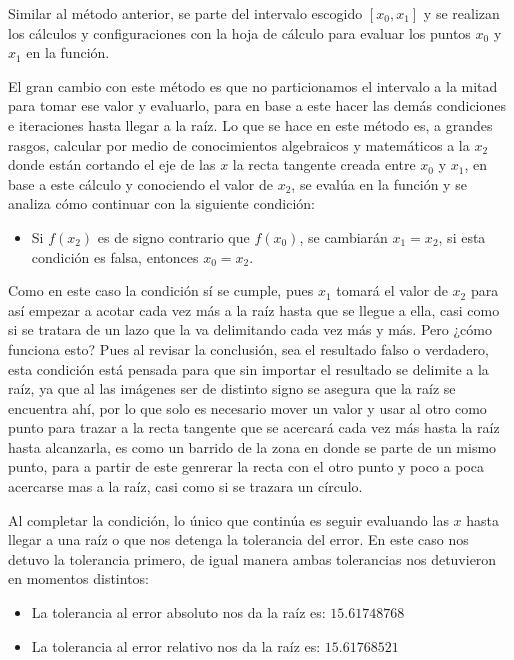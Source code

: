 \documentclass{article}
\begin{document}
Similar al método anterior, se parte del intervalo escogido \([x_0, x_1]\) y se realizan los cálculos y configuraciones con la hoja de cálculo para evaluar los puntos \(x_0\) y \(x_1\) en la función.

El gran cambio con este método es que no particionamos el intervalo a la mitad para tomar ese valor y evaluarlo, para en base a este hacer las demás condiciones e iteraciones hasta llegar a la raíz. Lo que se hace en este método es, a grandes rasgos, calcular por medio de conocimientos algebraicos y matemáticos a la \(x_2\) donde están cortando el eje de las \(x\) la recta tangente creada entre \(x_0\) y \(x_1\), en base a este cálculo y conociendo el valor de \(x_2\), se evalúa en la función y se analiza cómo continuar con la siguiente condición:
\begin{itemize}
    \item Si \(f(x_2)\) es de signo contrario que \(f(x_0)\), se cambiarán \(x_1 = x_2\), si esta condición es falsa, entonces \(x_0 = x_2\).
\end{itemize}
Como en este caso la condición sí se cumple, pues \(x_1\) tomará el valor de \(x_2\) para así empezar a acotar cada vez más a la raíz hasta que se llegue a ella, casi como si se tratara de un lazo que la va delimitando cada vez más y más. Pero ¿cómo funciona esto?
Pues al revisar la conclusión, sea el resultado falso o verdadero, esta condición está pensada para que sin importar el resultado se delimite a la raíz, ya que al las imágenes ser de distinto signo se asegura que la raíz se encuentra ahí, por lo que solo es necesario mover un valor y usar al otro como punto para trazar a la recta tangente que se acercará cada vez más hasta la raíz hasta alcanzarla, es como un barrido de la zona en donde se parte de un mismo punto, para a partir de este genrerar la recta con el otro punto y poco a poca acercarse mas a la raíz, casi como si se trazara un círculo.

Al completar la condición, lo único que continúa es seguir evaluando las \(x\) hasta llegar a una raíz o que nos detenga la tolerancia del error. En este caso nos detuvo la tolerancia primero, de igual manera ambas tolerancias nos detuvieron en momentos distintos:
\begin{itemize}
    \item La tolerancia al error absoluto nos da la raíz es: \(15.61748768\)
    \item La tolerancia al error relativo nos da la raíz es: \(15.61768521\)
\end{itemize}
\end{document}
